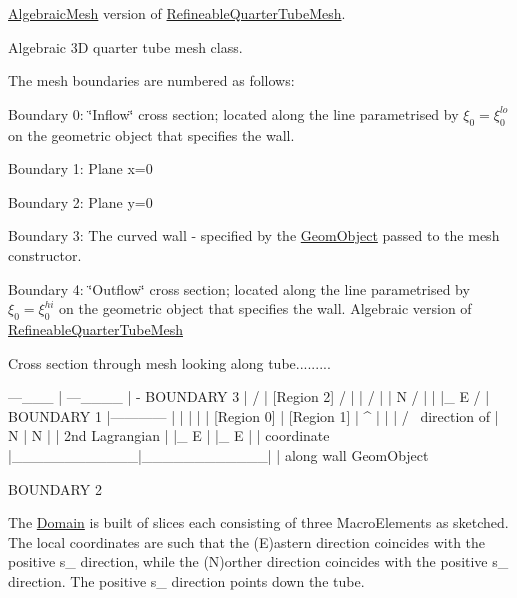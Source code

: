 \hyperlink{classoomph_1_1AlgebraicMesh}{Algebraic\+Mesh} version of \hyperlink{classoomph_1_1RefineableQuarterTubeMesh}{Refineable\+Quarter\+Tube\+Mesh}. 

Algebraic 3D quarter tube mesh class.

The mesh boundaries are numbered as follows\+:
\begin{DoxyItemize}
\item Boundary 0\+: \char`\"{}\+Inflow\char`\"{} cross section; located along the line parametrised by $ \xi_0 = \xi_0^{lo} $ on the geometric object that specifies the wall.
\item Boundary 1\+: Plane x=0
\item Boundary 2\+: Plane y=0
\item Boundary 3\+: The curved wall -\/ specified by the \hyperlink{classoomph_1_1GeomObject}{Geom\+Object} passed to the mesh constructor.
\item Boundary 4\+: \char`\"{}\+Outflow\char`\"{} cross section; located along the line parametrised by $ \xi_0 = \xi_0^{hi} $ on the geometric object that specifies the wall. Algebraic version of \hyperlink{classoomph_1_1RefineableQuarterTubeMesh}{Refineable\+Quarter\+Tube\+Mesh}
\end{DoxyItemize}

Cross section through mesh looking along tube......... \begin{DoxyVerb}                 ---___
                |      ---____
                |              -   BOUNDARY 3
                |                /
                |  [Region 2]   /  |
                |              /     |
                | N           /        |
                | |_ E       /          |
  BOUNDARY 1    |------------            |
                |            |            |
                | [Region 0] | [Region 1] |  ^
                |            |            | / \  direction of
                | N          |    N       |  |   2nd Lagrangian
                | |_ E       |    |_ E    |  |   coordinate
                |____________|____________|  |   along wall GeomObject

                      BOUNDARY 2
\end{DoxyVerb}


The \hyperlink{classoomph_1_1Domain}{Domain} is built of slices each consisting of three Macro\+Elements as sketched. The local coordinates are such that the (E)astern direction coincides with the positive s\+\_ direction, while the (N)orther direction coincides with the positive s\+\_ direction. The positive s\+\_ direction points down the tube.

